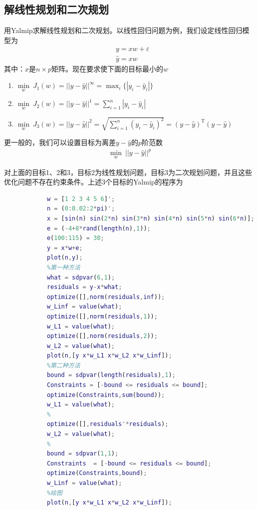         \subsection{解线性规划和二次规划}
            \par
            用Yalmip求解线性规划和二次规划。以线性回归问题为例，我们设定线性回归模型为
            \begin{align*}
            &y = xw+\varepsilon\\
            &\hat{y} = xw
            \end{align*}
            其中：$x$是$n\times p$矩阵。现在要求使下面的目标最小的$w$
            \begin{enumerate}
            \item $\min\limits_w \ J_1(w) = ||y - \hat{y}||^\infty = \max_i \{|y_i - \hat{y}_i|\}$
            \item $\min\limits_w \ J_2(w) = ||y - \hat{y}||^1 = \sum_{i = 1}^n |y_i - \hat{y}_i|$
            \item $\min\limits_w \ J_3(w) = ||y - \hat{y}||^2 =  \sqrt{\sum_{i = 1}^n (y_i - \hat{y}_i)^2} = (y - \hat{y})^\mathrm{T}(y - \hat{y})$
            \end{enumerate}
            更一般的，我们可以设置目标为离差$y - \hat{y}$的$p$阶范数
            \begin{align*}
            \min_w \ ||y - \hat{y}||^p
            \end{align*}
            \par
            对上面的目标1、2和3，目标2为线性规划问题，目标3为二次规划问题，并且这些优化问题不存在约束条件。上述3个目标的Yalmip的程序为
            \begin{lstlisting}[language = Matlab]
            %% 线性规划&二次规划----线性回归示例
            w = [1 2 3 4 5 6]';
            n = (0:0.02:2*pi)';
            x = [sin(n) sin(2*n) sin(3*n) sin(4*n) sin(5*n) sin(6*n)];
            e = (-4+8*rand(length(n),1));
            e(100:115) = 30;
            y = x*w+e;
            plot(n,y);
            %第一种方法
            what = sdpvar(6,1);
            residuals = y-x*what;
            optimize([],norm(residuals,inf));
            w_Linf = value(what);
            optimize([],norm(residuals,1));
            w_L1 = value(what);
            optimize([],norm(residuals,2));
            w_L2 = value(what);
            plot(n,[y x*w_L1 x*w_L2 x*w_Linf]);
            %第二种方法
            bound = sdpvar(length(residuals),1);
            Constraints = [-bound <= residuals <= bound];
            optimize(Constraints,sum(bound));
            w_L1 = value(what);
            %
            optimize([],residuals'*residuals);
            w_L2 = value(what);
            %
            bound = sdpvar(1,1);
            Constraints  = [-bound <= residuals <= bound];
            optimize(Constraints,bound);
            w_Linf = value(what);
            %绘图
            plot(n,[y x*w_L1 x*w_L2 x*w_Linf]);
            \end{lstlisting}

